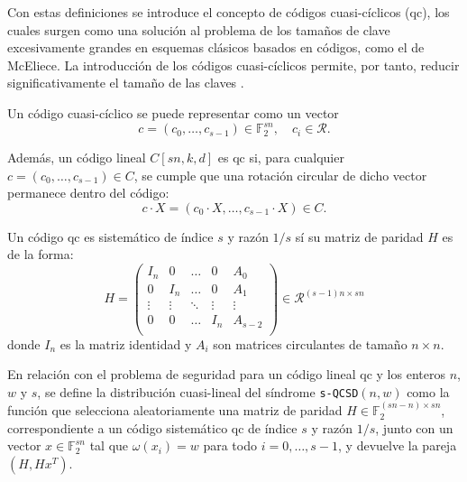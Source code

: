 Con estas definiciones se introduce el concepto de códigos cuasi-cíclicos (\acrshort{qc}), los cuales surgen como una solución al problema de los tamaños de clave excesivamente grandes en esquemas clásicos basados en códigos, como el de McEliece. La introducción de los códigos cuasi-cíclicos permite, por tanto, reducir significativamente el tamaño de las claves \cite{Gaborit2005ShorterKF}.  
\newline

Un código cuasi-cíclico se puede representar como un vector 
\begin{equation}
c = (c_0, \hdots, c_{s-1}) \in \mathbb{F}_2^{sn}, \quad c_i \in \mathcal{R}.
\end{equation} 

Además, un código lineal \(C[sn,k,d]\) es \acrshort{qc} si, para cualquier \(c = (c_0, \hdots, c_{s-1}) \in C\), se cumple que una rotación circular de dicho vector permanece dentro del código:
\begin{equation}
	c \cdot X = (c_0 \cdot X, \hdots, c_{s-1} \cdot X) \in C.
\end{equation}

Un código \acrshort{qc} es sistemático de índice \(s\) y razón \(1/s\) sí su matriz de paridad \(H\) es de la forma:
\begin{equation}
	H=\begin{pmatrix}
		I_n &0&\hdots&0&A_0\\
		0 &I_n&\hdots&0&A_1\\
		\vdots &\vdots&\ddots&\vdots&\vdots\\
		0 &0&\hdots&I_n&A_{s-2}\\
	\end{pmatrix}\in \mathcal{R}^{(s-1)n\times sn}
\end{equation}
donde \(I_n\) es la matriz identidad y \(A_i\) son matrices circulantes de tamaño \(n\times n\).
\newline

\label{sec:hqc}
En relación con el problema de seguridad para un código lineal \acrshort{qc} y los enteros \(n\), \(w\) y \(s\), se define la distribución cuasi-lineal del síndrome \texttt{s-QCSD}\((n,w)\) como la función que selecciona aleatoriamente una matriz de paridad \(H \in \mathbb{F}_2^{(sn-n)\times sn}\), correspondiente a un código sistemático \acrshort{qc} de índice \(s\) y razón \(1/s\), junto con un vector \(x \in \mathbb{F}_2^{sn}\) tal que \(\omega(x_i) = w\) para todo \(i=0,\ldots,s-1\), y devuelve la pareja \((H, Hx^T)\).
\newline

